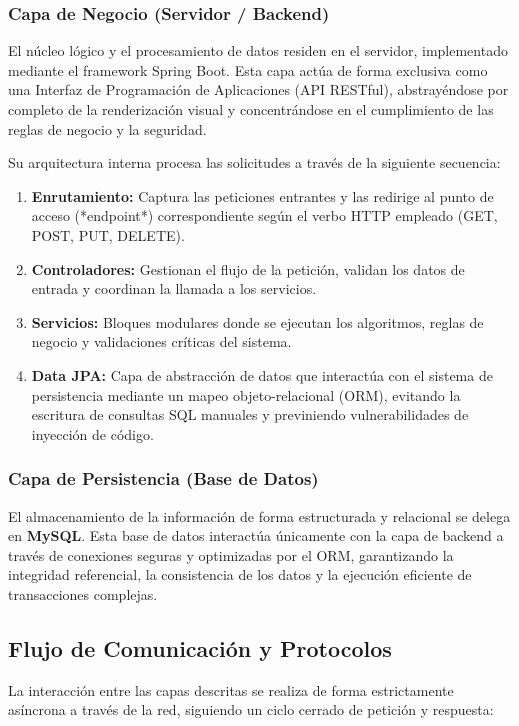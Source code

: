 \subsubsection{Capa de Negocio (Servidor / Backend)}
El núcleo lógico y el procesamiento de datos residen en el servidor, implementado mediante el framework Spring Boot. Esta capa actúa de forma exclusiva como una Interfaz de Programación de Aplicaciones (API RESTful), abstrayéndose por completo de la renderización visual y concentrándose en el cumplimiento de las reglas de negocio y la seguridad.

Su arquitectura interna procesa las solicitudes a través de la siguiente secuencia:
\begin{enumerate}
    \item \textbf{Enrutamiento:} Captura las peticiones entrantes y las redirige al punto de acceso (*endpoint*) correspondiente según el verbo HTTP empleado (GET, POST, PUT, DELETE).
    \item \textbf{Controladores:} Gestionan el flujo de la petición, validan los datos de entrada y coordinan la llamada a los servicios.
    \item \textbf{Servicios:} Bloques modulares donde se ejecutan los algoritmos, reglas de negocio y validaciones críticas del sistema.
    \item \textbf{Data JPA:} Capa de abstracción de datos que interactúa con el sistema de persistencia mediante un mapeo objeto-relacional (ORM), evitando la escritura de consultas SQL manuales y previniendo vulnerabilidades de inyección de código.
\end{enumerate}

\subsubsection{Capa de Persistencia (Base de Datos)}
El almacenamiento de la información de forma estructurada y relacional se delega en \textbf{MySQL}. Esta base de datos interactúa únicamente con la capa de backend a través de conexiones seguras y optimizadas por el ORM, garantizando la integridad referencial, la consistencia de los datos y la ejecución eficiente de transacciones complejas.

\subsection{Flujo de Comunicación y Protocolos}
La interacción entre las capas descritas se realiza de forma estrictamente asíncrona a través de la red, siguiendo un ciclo cerrado de petición y respuesta:

